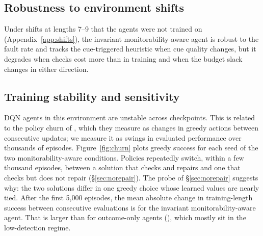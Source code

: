 \subsection{Robustness to environment shifts}
\label{sec:shifts}

Under shifts at lengths 7--9 that the agents were not trained on (Appendix~\ref{app:shifts}), the invariant monitorability-aware agent is robust to the fault rate and tracks the cue-triggered heuristic when cue quality changes, but it degrades when checks cost more than in training and when the budget slack changes in either direction.



\subsection{Training stability and sensitivity}
\label{sec:stability}
\label{sec:sensitivity}

DQN agents in this environment are unstable across checkpoints. This is related to the policy churn of \citet{schaul2022churn}, which they measure as changes in greedy actions between consecutive updates; we measure it as swings in evaluated performance over thousands of episodes. Figure~\ref{fig:churn} plots greedy success for each seed of the two monitorability-aware conditions. Policies repeatedly switch, within a few thousand episodes, between a solution that checks and repairs and one that checks but does not repair (\S\ref{sec:norepair}). The probe of \S\ref{sec:norepair} suggests why: the two solutions differ in one greedy choice whose learned values are nearly tied. After the first 5{,}000 episodes, the mean absolute change in training-length success between consecutive evaluations is  for the invariant monitorability-aware agent. That is larger than for outcome-only agents (), which mostly sit in the low-detection regime.


